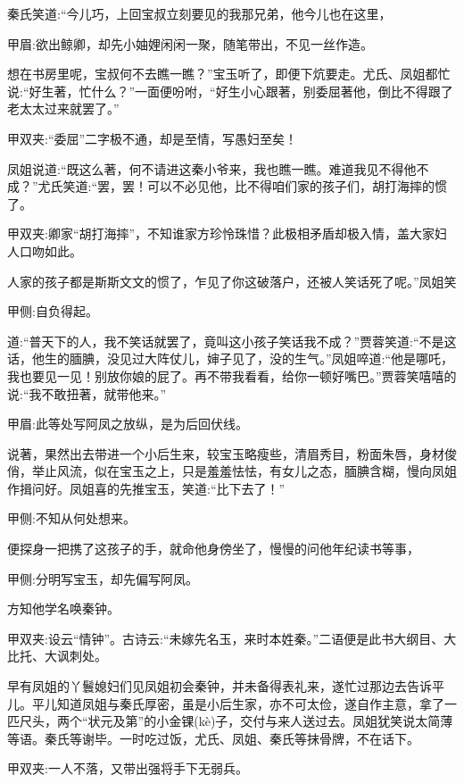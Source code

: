\begin{parag}
    秦氏笑道:“今儿巧，上回宝叔立刻要见的我那兄弟，他今儿也在这里，\begin{note}甲眉:欲出鲸卿，却先小妯娌闲闲一聚，随笔带出，不见一丝作造。\end{note}想在书房里呢，宝叔何不去瞧一瞧？”宝玉听了，即便下炕要走。尤氏、凤姐都忙说:“好生著，忙什么？”一面便吩咐，“好生小心跟著，别委屈著他，倒比不得跟了老太太过来就罢了。”\begin{note}甲双夹:“委屈”二字极不通，却是至情，写愚妇至矣！\end{note}凤姐说道:“既这么著，何不请进这秦小爷来，我也瞧一瞧。难道我见不得他不成？”尤氏笑道:“罢，罢！可以不必见他，比不得咱们家的孩子们，胡打海摔的惯了。\begin{note}甲双夹:卿家“胡打海摔”，不知谁家方珍怜珠惜？此极相矛盾却极入情，盖大家妇人口吻如此。\end{note}人家的孩子都是斯斯文文的惯了，乍见了你这破落户，还被人笑话死了呢。”凤姐笑\begin{note}甲侧:自负得起。\end{note}道:“普天下的人，我不笑话就罢了，竟叫这小孩子笑话我不成？”贾蓉笑道:“不是这话，他生的腼腆，没见过大阵仗儿，婶子见了，没的生气。”凤姐啐道:“他是哪吒，我也要见一见！别放你娘的屁了。再不带我看看，给你一顿好嘴巴。”贾蓉笑嘻嘻的说:“我不敢扭著，就带他来。”\begin{note}甲眉:此等处写阿凤之放纵，是为后回伏线。\end{note}
\end{parag}


\begin{parag}
    说著，果然出去带进一个小后生来，较宝玉略瘦些，清眉秀目，粉面朱唇，身材俊俏，举止风流，似在宝玉之上，只是羞羞怯怯，有女儿之态，腼腆含糊，慢向凤姐作揖问好。凤姐喜的先推宝玉，笑道:“比下去了！”\begin{note}甲侧:不知从何处想来。\end{note}便探身一把携了这孩子的手，就命他身傍坐了，慢慢的问他年纪读书等事，\begin{note}甲侧:分明写宝玉，却先偏写阿凤。\end{note}方知他学名唤秦钟。\begin{note}甲双夹:设云“情钟”。古诗云:“未嫁先名玉，来时本姓秦。”二语便是此书大纲目、大比托、大讽刺处。\end{note}早有凤姐的丫鬟媳妇们见凤姐初会秦钟，并未备得表礼来，遂忙过那边去告诉平儿。平儿知道凤姐与秦氏厚密，虽是小后生家，亦不可太俭，遂自作主意，拿了一匹尺头，两个“状元及第”的小金锞(kè)子，交付与来人送过去。凤姐犹笑说太简薄等语。秦氏等谢毕。一时吃过饭，尤氏、凤姐、秦氏等抹骨牌，不在话下。\begin{note}甲双夹:一人不落，又带出强将手下无弱兵。\end{note}
\end{parag}


